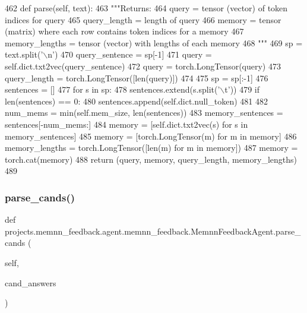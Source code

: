 \begin{DoxyCode}
462     \textcolor{keyword}{def }parse(self, text):
463         \textcolor{stringliteral}{"""Returns:}
464 \textcolor{stringliteral}{            query = tensor (vector) of token indices for query}
465 \textcolor{stringliteral}{            query\_length = length of query}
466 \textcolor{stringliteral}{            memory = tensor (matrix) where each row contains token indices for a memory}
467 \textcolor{stringliteral}{            memory\_lengths = tensor (vector) with lengths of each memory}
468 \textcolor{stringliteral}{        """}
469         sp = text.split(\textcolor{stringliteral}{'\(\backslash\)n'})
470         query\_sentence = sp[-1]
471         query = self.dict.txt2vec(query\_sentence)
472         query = torch.LongTensor(query)
473         query\_length = torch.LongTensor([len(query)])
474 
475         sp = sp[:-1]
476         sentences = []
477         \textcolor{keywordflow}{for} s \textcolor{keywordflow}{in} sp:
478             sentences.extend(s.split(\textcolor{stringliteral}{'\(\backslash\)t'}))
479         \textcolor{keywordflow}{if} len(sentences) == 0:
480             sentences.append(self.dict.null\_token)
481 
482         num\_mems = min(self.mem\_size, len(sentences))
483         memory\_sentences = sentences[-num\_mems:]
484         memory = [self.dict.txt2vec(s) \textcolor{keywordflow}{for} s \textcolor{keywordflow}{in} memory\_sentences]
485         memory = [torch.LongTensor(m) \textcolor{keywordflow}{for} m \textcolor{keywordflow}{in} memory]
486         memory\_lengths = torch.LongTensor([len(m) \textcolor{keywordflow}{for} m \textcolor{keywordflow}{in} memory])
487         memory = torch.cat(memory)
488         \textcolor{keywordflow}{return} (query, memory, query\_length, memory\_lengths)
489 
\end{DoxyCode}
\mbox{\label{classprojects_1_1memnn__feedback_1_1agent_1_1memnn__feedback_1_1MemnnFeedbackAgent_a785f2bba986bca5cee12463a66b34889}} 
\subsubsection{\texorpdfstring{parse\+\_\+cands()}{parse\_cands()}}
{\footnotesize\ttfamily def projects.\+memnn\+\_\+feedback.\+agent.\+memnn\+\_\+feedback.\+Memnn\+Feedback\+Agent.\+parse\+\_\+cands (\begin{DoxyParamCaption}\item[{}]{self,  }\item[{}]{cand\+\_\+answers }\end{DoxyParamCaption})}

